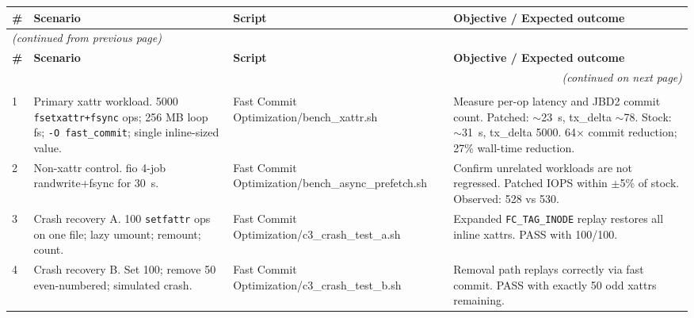 \documentclass[12pt,a4paper]{article}
\begin{document}
\begin{small}
\setlength{\LTpre}{0pt}
\setlength{\LTpost}{0pt}
\renewcommand{\arraystretch}{1.15}
\begin{longtable}{@{}p{0.3cm}p{3.2cm}p{3.8cm}p{6.0cm}@{}}
\toprule
\textbf{\#} & \textbf{Scenario} & \textbf{Script} & \textbf{Objective / Expected outcome} \\
\midrule
\endfirsthead

\multicolumn{4}{l}{\small\textit{(continued from previous page)}} \\
\toprule
\textbf{\#} & \textbf{Scenario} & \textbf{Script} & \textbf{Objective / Expected outcome} \\
\midrule
\endhead

\midrule
\multicolumn{4}{r}{\small\textit{(continued on next page)}} \\
\endfoot

\bottomrule
\endlastfoot

\multicolumn{4}{@{}l}{\textit{Candidate 3: inline xattr fast commit}} \\
1 & Primary xattr workload. 5000 \texttt{fsetxattr+fsync} ops; 256 MB loop fs; \texttt{-O fast\_commit}; single inline-sized value.
  & {\scriptsize\ttfamily\raggedright Fast Commit Optimization/\allowbreak bench\_xattr.sh\par}
  & Measure per-op latency and JBD2 commit count. Patched: $\sim$23~s, tx\_delta $\sim$78. Stock: $\sim$31~s, tx\_delta 5000. 64$\times$ commit reduction; 27\% wall-time reduction. \\

2 & Non-xattr control. fio 4-job randwrite+fsync for 30~s.
  & {\scriptsize\ttfamily\raggedright Fast Commit Optimization/\allowbreak bench\_async\_prefetch.sh\par}
  & Confirm unrelated workloads are not regressed. Patched IOPS within $\pm$5\% of stock. Observed: 528 vs 530. \\

3 & Crash recovery A. 100 \texttt{setfattr} ops on one file; lazy umount; remount; count.
  & {\scriptsize\ttfamily\raggedright Fast Commit Optimization/\allowbreak c3\_crash\_test\_a.sh\par}
  & Expanded \texttt{FC\_TAG\_INODE} replay restores all inline xattrs. PASS with 100/100. \\

4 & Crash recovery B. Set 100; remove 50 even-numbered; simulated crash.
  & {\scriptsize\ttfamily\raggedright Fast Commit Optimization/\allowbreak c3\_crash\_test\_b.sh\par}
  & Removal path replays correctly via fast commit. PASS with exactly 50 odd xattrs remaining. \\


\end{longtable}
\end{small}
\end{document}
